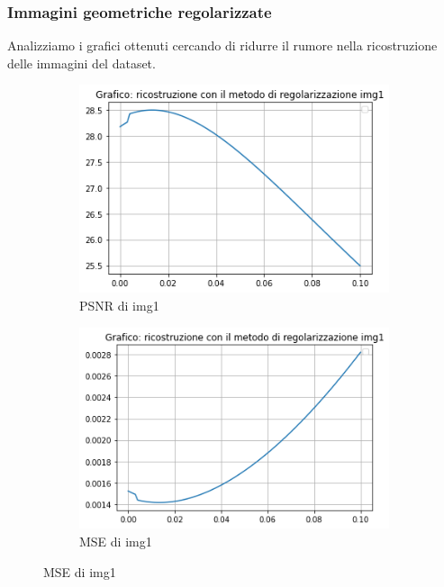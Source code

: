 \subsubsection{Immagini geometriche regolarizzate}
Analizziamo i grafici ottenuti cercando di ridurre il rumore nella ricostruzione delle immagini del dataset. 
\begin{figure}[H]
    \centering
    \begin{subfigure}{0.5\textwidth}
        \centering
        \includegraphics[width=\textwidth]{output/PSNR/outputPSNR-img1.png}
        \caption{PSNR di img1}
        \label{fig:img1PSNR}
    \end{subfigure}\hfill
    \begin{subfigure}{0.5\textwidth}
        \centering
        \includegraphics[width=\textwidth]{output/MSE/outputMSE-img1.png}
        \caption{MSE di img1}
        \label{fig:img1MSE}
    \end{subfigure}


\end{figure}
